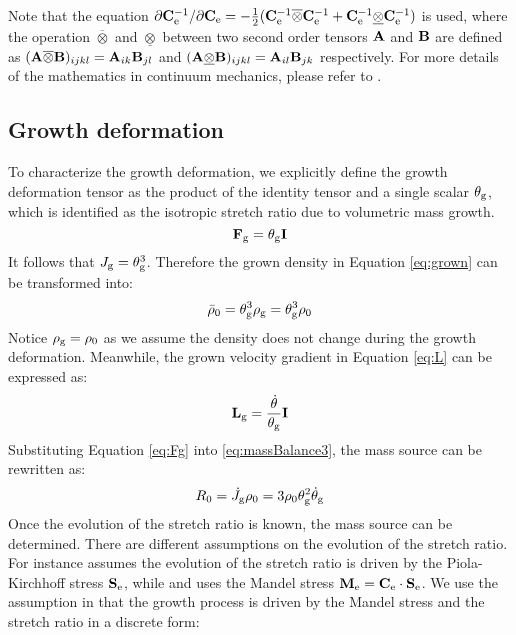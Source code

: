 Note that the equation $\partial\bold{C}_{\mathrm{e}}^{-1}/\partial\bold{C}_{\mathrm{e}} = -\frac{1}{2}(\bold{C}_{\mathrm{e}}^{-1} \overline\otimes \bold{C}_{\mathrm{e}}^{-1} + \bold{C}_{\mathrm{e}}^{-1} \underline\otimes \bold{C}_{\mathrm{e}}^{-1})$ is used, where the operation $\overline\otimes$ and $\underline\otimes$ between two second order tensors $\bold{A}$ and $\bold{B}$ are defined as $(\bold{A}\overline\otimes\bold{B})_{ijkl} = {\bold{A}}_{ik}{\bold{B}}_{jl}$ and $(\bold{A}\underline\otimes\bold{B})_{ijkl} = {\bold{A}}_{il}{\bold{B}}_{jk}$ respectively. For more details of the mathematics in continuum mechanics, please refer to \cite{Holzapfel}. 

\subsection{Growth deformation}
To characterize the growth deformation, we explicitly define the growth deformation tensor as the product of the identity tensor and a single scalar $\theta_{\mathrm{g}}$, which is identified as the isotropic stretch ratio due to volumetric mass growth.
\begin{equation} \label{eq:Fg}
\bold{F}_{\mathrm{g}} = \theta_{\mathrm{g}} \bold{I}
\end{equation}
It follows that $J_{\mathrm{g}} = \theta_{\mathrm{g}} ^ 3$. Therefore the grown density in Equation \ref{eq:grown} can be transformed into:
\begin{equation}
\bar{\rho}_0 = \theta_{\mathrm{g}}^3\rho_{\mathrm{g}} = \theta_{\mathrm{g}}^3\rho_0
\end{equation}
Notice $\rho_{\mathrm{g}} = \rho_0$ as we assume the density does not change during the growth deformation. Meanwhile, the grown velocity gradient in Equation \ref{eq:L} can be expressed as:
\begin{equation}
\bold{L}_{\mathrm{g}} = \frac{\dot\theta}{\theta_{\mathrm{g}}}\bold{I}
\end{equation}
Substituting Equation \ref{eq:Fg} into \ref{eq:massBalance3}, the mass source can be rewritten as:
\begin{equation} \label{eq:massBalance4}
R_0 = \dot{J}_{\mathrm{g}} \rho_0 = 3\rho_0 \theta_{\mathrm{g}}^2\dot\theta_{\mathrm{g}}
\end{equation}
Once the evolution of the stretch ratio is known, the mass source can be determined. There are different assumptions on the evolution of the stretch ratio. For instance \cite{Lubarda2} assumes the evolution of the stretch ratio is driven by the Piola-Kirchhoff stress $\bold{S}_{\mathrm{e}}$, while \cite{Goktepe2} and \cite{Himpel} uses the Mandel stress $\bold{M}_{\mathrm{e}} = \bold{C}_{\mathrm{e}} \cdot \bold{S}_{\mathrm{e}}$.
We use the assumption in \cite{Goktepe2} that the growth process is driven by the Mandel stress and the stretch ratio in a discrete form:
